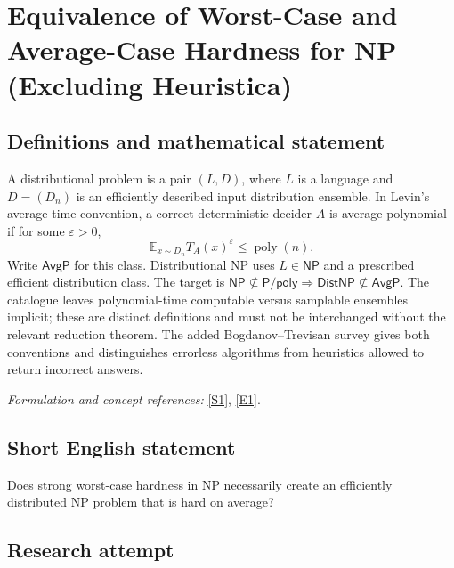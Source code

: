 \documentclass[11pt]{article}
\newcommand{\sref}[2]{\hyperlink{source:#1:#2}{[S#2]}}
\newcommand{\eref}[2]{\hyperlink{extra:#1:#2}{[E#2]}}
\newif\ifshowcatalogue
\newcommand{\cataloguescope}[1]{\ifshowcatalogue
 \paragraph{Exact scope in the supplied catalogue.}
 \begin{quote}\small #1\end{quote}\fi}
\begin{document}
\setcounter{section}{0}
\clearpage
\section*{\texorpdfstring{Equivalence of Worst-Case and Average-Case Hardness for NP (Excluding Heuristica)}{Equivalence of Worst-Case and Average-Case Hardness for NP (Excluding Heuristica)}}\label{30006698}
\subsection{Definitions and mathematical statement}
A distributional problem is a pair $(L,D)$, where $L$ is a language and $D=(D_n)$ is an efficiently described input distribution ensemble. In Levin's average-time convention, a correct deterministic decider $A$ is average-polynomial if for some $\varepsilon>0$,
\[
 \mathbb E_{x\sim D_n} T_A(x)^\varepsilon\le\operatorname{poly}(n).
\]
Write $\mathsf{AvgP}$ for this class. Distributional NP uses $L\in\mathsf{NP}$ and a prescribed efficient distribution class. The target is $\mathsf{NP}\nsubseteq\mathsf{P/poly}\Rightarrow\mathsf{DistNP}\nsubseteq\mathsf{AvgP}$. The catalogue leaves polynomial-time computable versus samplable ensembles implicit; these are distinct definitions and must not be interchanged without the relevant reduction theorem. The added Bogdanov--Trevisan survey gives both conventions and distinguishes errorless algorithms from heuristics allowed to return incorrect answers.
\par\smallskip\textit{Formulation and concept references:} \sref{30006698}{1}, \eref{30006698}{1}.
\cataloguescope{Prove or disprove that if NP is hard in the worst case (NP not in P/poly), then NP is hard on average (DistNP not in AvgP).}
\subsection{Short English statement}
Does strong worst-case hardness in NP necessarily create an efficiently distributed NP problem that is hard on average?
\subsection{Research attempt}
\end{document}
